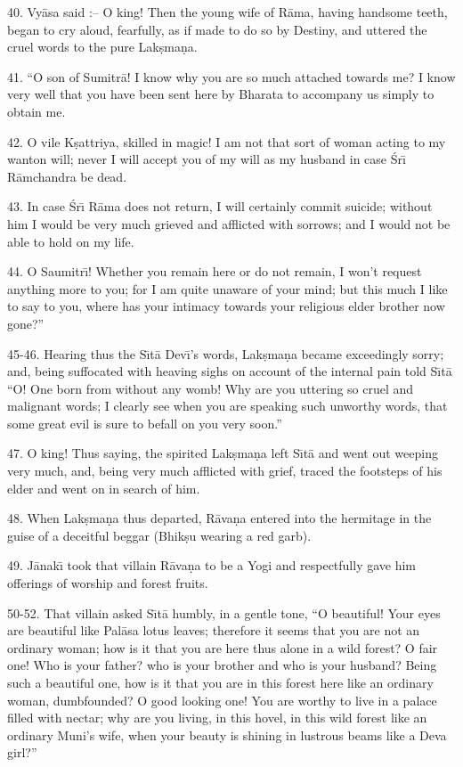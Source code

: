 40. Vy\=asa said :-- O king! Then the young wife of R\=ama, having handsome teeth, began to cry aloud, fearfully, as if made to do so by Destiny, and uttered the cruel words to the pure Lak\d{s}ma\d{n}a.

41. ``O son of Sumitr\=a! I know why you are so much attached towards me? I know very well that you have been sent here by Bharata to accompany us simply to obtain me.

42. O vile K\d{s}attriya, skilled in magic! I am not that sort of woman acting to my wanton will; never I will accept you of my will as my husband in case \'Sr\={\i} R\=amchandra be dead.

43. In case \'Sr\={\i} R\=ama does not return, I will certainly commit suicide; without him I would be very much grieved and afflicted with sorrows; and I would not be able to hold on my life.

44. O Saumitr\={\i}! Whether you remain here or do not remain, I won't request anything more to you; for I am quite unaware of your mind; but this much I like to say to you, where has your intimacy towards your religious elder brother now gone?''

45-46. Hearing thus the S\={\i}t\=a Dev\={\i}'s words, Lak\d{s}ma\d{n}a became exceedingly sorry; and, being suffocated with heaving sighs on account of the internal pain told S\={\i}t\=a ``O! One born from without any womb! Why are you uttering so cruel and malignant words; I clearly see when you are speaking such unworthy words, that some great evil is sure to befall on you very soon.''

47. O king! Thus saying, the spirited Lak\d{s}ma\d{n}a left S\={\i}t\=a and went out weeping very much, and, being very much afflicted with grief, traced the footsteps of his elder and went on in search of him.

48. When Lak\d{s}ma\d{n}a thus departed, R\=ava\d{n}a entered into the hermitage in the guise of a deceitful beggar (Bhik\d{s}u wearing a red garb).

49. J\=anak\={\i} took that villain R\=ava\d{n}a to be a Yogi and respectfully gave him offerings of worship and forest fruits.

50-52. That villain asked S\={\i}t\=a humbly, in a gentle tone, ``O beautiful! Your eyes are beautiful like Pal\=asa lotus leaves; therefore it seems that you are not an ordinary woman; how is it that you are here thus alone in a wild forest? O fair one! Who is your father? who is your brother and who is your husband? Being such a beautiful one, how is it that you are in this forest here like an ordinary woman, dumbfounded? O good looking one! You are worthy to live in a palace filled with nectar; why are you living, in this hovel, in this wild forest like an ordinary Muni's wife, when your beauty is shining in lustrous beams like a Deva girl?''

